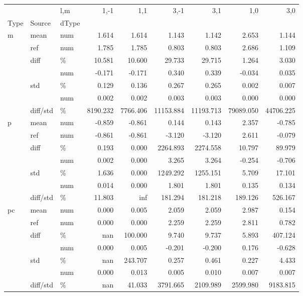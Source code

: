 \documentclass[10pt]{article}
\begin{document}
\begin{table}
\begin{tabular}{lllrrrrrr}
\toprule
   &          & l,m &     1,-1 &      1,1 &      3,-1 &       3,1 &       1,0 &       3,0 \\
Type & Source & dType &          &          &           &           &           &           \\
\midrule
m & mean & num &    1.614 &    1.614 &     1.143 &     1.142 &     2.653 &     1.144 \\
   & ref & num &    1.785 &    1.785 &     0.803 &     0.803 &     2.686 &     1.109 \\
   & diff & \% &   10.581 &   10.600 &    29.733 &    29.715 &     1.264 &     3.030 \\
   &          & num &   -0.171 &   -0.171 &     0.340 &     0.339 &    -0.034 &     0.035 \\
   & std & \% &    0.129 &    0.136 &     0.267 &     0.265 &     0.002 &     0.007 \\
   &          & num &    0.002 &    0.002 &     0.003 &     0.003 &     0.000 &     0.000 \\
   & diff/std & \% & 8190.232 & 7766.406 & 11153.884 & 11193.713 & 79089.050 & 44706.225 \\
p & mean & num &   -0.859 &   -0.861 &     0.144 &     0.143 &     2.357 &    -0.785 \\
   & ref & num &   -0.861 &   -0.861 &    -3.120 &    -3.120 &     2.611 &    -0.079 \\
   & diff & \% &    0.193 &    0.000 &  2264.893 &  2274.558 &    10.797 &    89.979 \\
   &          & num &    0.002 &    0.000 &     3.265 &     3.264 &    -0.254 &    -0.706 \\
   & std & \% &    1.636 &    0.000 &  1249.292 &  1255.151 &     5.709 &    17.101 \\
   &          & num &    0.014 &    0.000 &     1.801 &     1.801 &     0.135 &     0.134 \\
   & diff/std & \% &   11.803 &      inf &   181.294 &   181.218 &   189.126 &   526.167 \\
pc & mean & num &    0.000 &    0.005 &     2.059 &     2.059 &     2.987 &     0.154 \\
   & ref & num &    0.000 &    0.000 &     2.259 &     2.259 &     2.811 &     0.782 \\
   & diff & \% &      nan &  100.000 &     9.740 &     9.737 &     5.893 &   407.124 \\
   &          & num &    0.000 &    0.005 &    -0.201 &    -0.200 &     0.176 &    -0.628 \\
   & std & \% &      nan &  243.707 &     0.257 &     0.461 &     0.227 &     4.433 \\
   &          & num &    0.000 &    0.013 &     0.005 &     0.010 &     0.007 &     0.007 \\
   & diff/std & \% &      nan &   41.033 &  3791.665 &  2109.989 &  2599.980 &  9183.815 \\
\bottomrule
\end{tabular}


\end{table}
\end{document}
